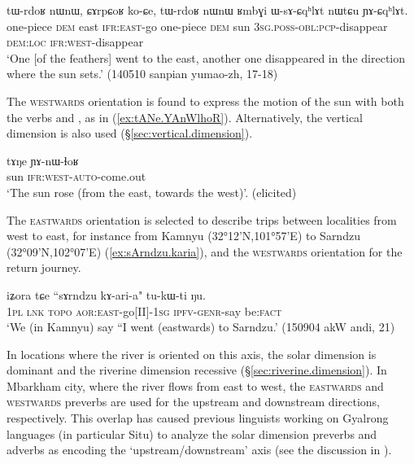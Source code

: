 \begin{exe}
\ex \label{ex:koCe.YACqhlAt}
\gll tɯ-rdoʁ nɯnɯ, ɕɤrpɕoʁ ko-ɕe, tɯ-rdoʁ nɯnɯ ʁmbɣi ɯ-sɤ-ɕqʰlɤt nɯtɕu ɲɤ-ɕqʰlɤt. \\
one-piece \textsc{dem} east \textsc{ifr}:\textsc{east}-go one-piece \textsc{dem} sun \textsc{3sg}.\textsc{poss}-\textsc{obl}:\textsc{pcp}-disappear \textsc{dem}:\textsc{loc} \textsc{ifr}:\textsc{west}-disappear \\
\glt `One [of the feathers] went to the east, another one disappeared in the direction where the sun sets.' (140510 sanpian yumao-zh, 17-18)
\end{exe}

The \textsc{westwards} orientation is found to express the motion of the sun with both the verbs  and , as in (\ref{ex:tANe.YAnWlhoR}). Alternatively, the vertical dimension is also used (§\ref{sec:vertical.dimension}).

\begin{exe}
\ex \label{ex:tANe.YAnWlhoR}
\gll tɤŋe ɲɤ-nɯ-ɬoʁ \\
sun \textsc{ifr}:\textsc{west}-\textsc{auto}-come.out \\
\glt `The sun rose (from the east, towards the west)'. (elicited)
\end{exe}

The \textsc{eastwards} orientation is selected to describe trips between localities from west to east, for instance from Kamnyu (32°12'N,101°57'E) to Sarndzu (32°09'N,102°07'E) (\ref{ex:sArndzu.karia}), and the \textsc{westwards} orientation for the return journey.

\begin{exe}
\ex \label{ex:sArndzu.karia}
\gll  iʑora tɕe ``sɤrndzu kɤ-ari-a" tu-kɯ-ti ŋu. \\
\textsc{1pl} \textsc{lnk}  \textsc{topo} \textsc{aor}:\textsc{east}-go[II]-\textsc{1sg} \textsc{ipfv}-\textsc{genr}-say be:\textsc{fact} \\
\glt `We (in Kamnyu) say ``I went (eastwards) to Sarndzu.' (150904 akW andi, 21)
\end{exe}

In locations where the river is oriented on this axis, the solar dimension is dominant and the riverine dimension recessive (§\ref{sec:riverine.dimension}). In Mbarkham city, where the river flows from east to west, the \textsc{eastwards} and \textsc{westwards} preverbs are used for the upstream and downstream directions, respectively. This overlap has caused previous linguists working on Gyalrong languages (in particular Situ) to analyze the solar dimension preverbs and adverbs as encoding the `upstream/downstream' axis (see the discussion in \citealt{lin02dimension}).

